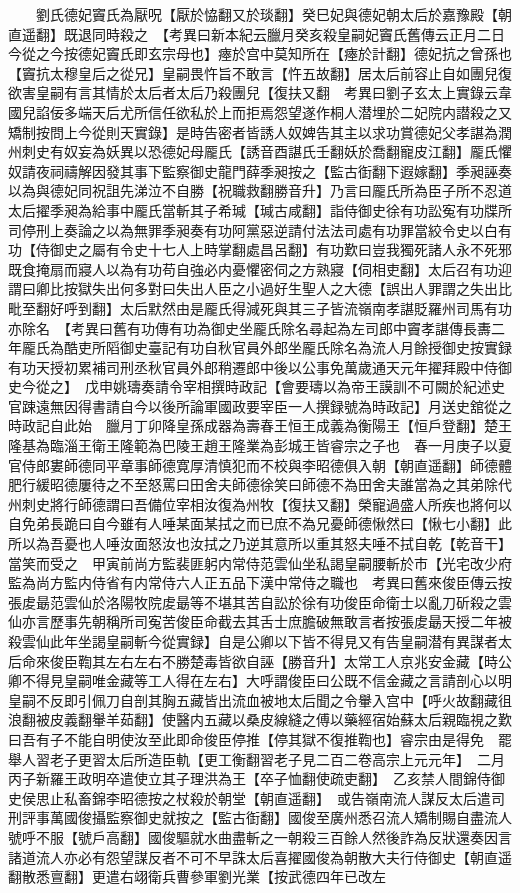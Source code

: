 　　劉氏德妃竇氏為厭呪【厭於恊翻又於琰翻】癸巳妃與德妃朝太后於嘉豫殿【朝直遥翻】既退同時殺之　【考異曰新本紀云臘月癸亥殺皇嗣妃竇氏舊傳云正月二日今從之今按德妃竇氏即玄宗母也】瘞於宫中莫知所在【瘞於計翻】德妃抗之曾孫也【竇抗太穆皇后之從兄】皇嗣畏忤旨不敢言【忤五故翻】居太后前容止自如團兒復欲害皇嗣有言其情於太后者太后乃殺團兒【復扶又翻　考異曰劉子玄太上實錄云韋國兒諂佞多端天后尤所信任欲私於上而拒焉怨望遂作桐人潜埋於二妃院内譛殺之又矯制按問上今從則天實錄】是時告密者皆誘人奴婢告其主以求功賞德妃父孝諶為潤州刺史有奴妄為妖異以恐德妃母龎氏【誘音酉諶氏壬翻妖於喬翻寵皮江翻】龎氏懼奴請夜祠禱解因發其事下監察御史龍門薛季昶按之【監古衘翻下遐嫁翻】季昶誣奏以為與德妃同祝詛先涕泣不自勝【祝職救翻勝音升】乃言曰龎氏所為臣子所不忍道太后擢季昶為給事中龎氏當斬其子希瑊【瑊古咸翻】詣侍御史徐有功訟寃有功牒所司停刑上奏論之以為無罪季昶奏有功阿黨惡逆請付法法司處有功罪當絞令史以白有功【侍御史之屬有令史十七人上時掌翻處昌呂翻】有功歎曰豈我獨死諸人永不死邪既食掩扇而寢人以為有功苟自強必内憂懼密伺之方熟寢【伺相吏翻】太后召有功迎謂曰卿比按獄失出何多對曰失出人臣之小過好生聖人之大德【誤出人罪謂之失出比毗至翻好呼到翻】太后默然由是龎氏得減死與其三子皆流嶺南孝諶貶羅州司馬有功亦除名　【考異曰舊有功傳有功為御史坐龎氏除名尋起為左司郎中竇孝諶傳長夀二年龎氏為酷吏所䧟御史臺記有功自秋官員外郎坐龎氏除名為流人月餘授御史按實録有功天授初累補司刑丞秋官員外郎稍遷郎中後以公事免萬歲通天元年擢拜殿中侍御史今從之】　戊申姚璹奏請令宰相撰時政記【會要璹以為帝王謨訓不可闕於紀述史官踈遠無因得書請自今以後所論軍國政要宰臣一人撰録號為時政記】月送史舘從之時政記自此始　臘月丁卯降皇孫成器為壽春王恒王成義為衡陽王【恒戶登翻】楚王隆基為臨淄王衛王隆範為巴陵王趙王隆業為彭城王皆睿宗之子也　春一月庚子以夏官侍郎婁師德同平章事師德寛厚清慎犯而不校與李昭德俱入朝【朝直遥翻】師德體肥行緩昭德屢待之不至怒罵曰田舍夫師德徐笑曰師德不為田舍夫誰當為之其弟除代州刺史將行師德謂曰吾備位宰相汝復為州牧【復扶又翻】榮寵過盛人所疾也將何以自免弟長跪曰自今雖有人唾某面某拭之而已庶不為兄憂師德愀然曰【愀七小翻】此所以為吾憂也人唾汝面怒汝也汝拭之乃逆其意所以重其怒夫唾不拭自乾【乾音干】當笑而受之　甲寅前尚方監裴匪躬内常侍范雲仙坐私謁皇嗣腰斬於市【光宅改少府監為尚方監内侍省有内常侍六人正五品下漢中常侍之職也　考異曰舊來俊臣傳云按張䖍朂范雲仙於洛陽牧院䖍朂等不堪其苦自訟於徐有功俊臣命衛士以亂刀斫殺之雲仙亦言歷事先朝稱所司寃苦俊臣命截去其舌士庶膽破無敢言者按張䖍朂天授二年被殺雲仙此年坐謁皇嗣斬今從實録】自是公卿以下皆不得見又有告皇嗣潜有異謀者太后命來俊臣鞫其左右左右不勝楚毒皆欲自誣【勝音升】太常工人京兆安金藏【時公卿不得見皇嗣唯金藏等工人得在左右】大呼謂俊臣曰公既不信金藏之言請剖心以明皇嗣不反即引佩刀自剖其胸五藏皆出流血被地太后聞之令轝入宫中【呼火故翻藏徂浪翻被皮義翻轝羊茹翻】使醫内五藏以桑皮線縫之傅以藥經宿始蘇太后親臨視之歎曰吾有子不能自明使汝至此即命俊臣停推【停其獄不復推鞫也】睿宗由是得免　罷舉人習老子更習太后所造臣軌【更工衡翻習老子見二百二卷高宗上元元年】　二月丙子新羅王政明卒遣使立其子理洪為王【卒子恤翻使疏吏翻】　乙亥禁人間錦侍御史侯思止私畜錦李昭德按之杖殺於朝堂【朝直遥翻】　或告嶺南流人謀反太后遣司刑評事萬國俊攝監察御史就按之【監古衘翻】國俊至廣州悉召流人矯制賜自盡流人號呼不服【號戶高翻】國俊驅就水曲盡斬之一朝殺三百餘人然後詐為反狀還奏因言諸道流人亦必有怨望謀反者不可不早誅太后喜擢國俊為朝散大夫行侍御史【朝直遥翻散悉亶翻】更遣右翊衛兵曹參軍劉光業【按武德四年已改左